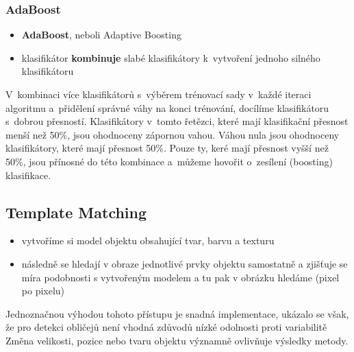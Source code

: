 \subsubsection{AdaBoost}
\begin{itemize}
  \item \textbf{AdaBoost}, neboli Adaptive Boosting
  \item klasifikátor \textbf{kombinuje} slabé klasifikátory k~vytvoření jednoho silného klasifikátoru
\end{itemize}
V~kombinaci více klasifikátorů s~výběrem trénovací sady v~každé iteraci algoritmu a~přidělení správné váhy na konci trénování, docílíme klasifikátoru s~dobrou přesností. Klasifikátory v~tomto řetězci, které mají klasifikační přesnost menší než 50\%, jsou ohodnoceny zápornou vahou. Váhou nula jsou ohodnoceny klasifikátory, které mají přesnost 50\%. Pouze ty, keré mají přesnost vyšší než 50\%, jsou přínosné do této kombinace a~můžeme hovořit o~zesílení (boosting) klasifikace. 

\subsection{Template Matching}
\begin{itemize}
\item vytvoříme si model objektu obsahující tvar, barvu a texturu 
\item následně se hledají v obraze jednotlivé prvky objektu samostatně a zjišťuje se míra podobnosti s vytvořeným modelem a tu pak v obrázku hledáme (pixel po pixelu)
\end{itemize}
Jednoznačnou výhodou tohoto přístupu je snadná implementace, ukázalo se však, že pro detekci obličejů není vhodná zdůvodů nízké odolnosti proti variabilitě
Změna velikosti, pozice nebo tvaru objektu významně ovlivňuje výsledky metody. 

